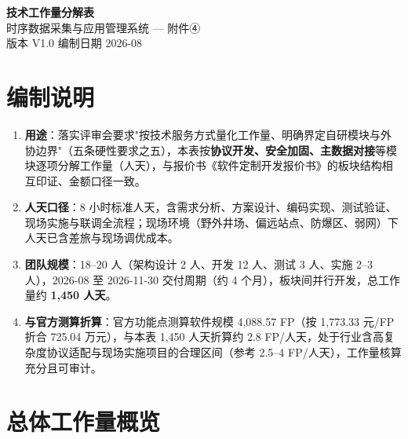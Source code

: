 \documentclass[11pt,a4paper]{ctexart}
\begin{document}
\begin{center}
{\Huge\bfseries 技术工作量分解表}\\[14pt]
{\large 时序数据采集与应用管理系统 — 附件④}\\[8pt]
{\large 版本 V1.0 \quad 编制日期 2026-08}
\end{center}

\vspace{1em}
\noindent\hrulefill
\vspace{1em}

\section{编制说明}

\begin{enumerate}[leftmargin=*]
  \item \textbf{用途}：落实评审会要求"按技术服务方式量化工作量、明确界定自研模块与外协边界"（五条硬性要求之五），本表按\textbf{协议开发、安全加固、主数据对接}等模块逐项分解工作量（人天），与报价书《软件定制开发报价书》的板块结构相互印证、金额口径一致。
  \item \textbf{人天口径}：8 小时标准人天，含需求分析、方案设计、编码实现、测试验证、现场实施与联调全流程；现场环境（野外井场、偏远站点、防爆区、弱网）下人天已含差旅与现场调优成本。
  \item \textbf{团队规模}：18--20 人（架构设计 2 人、开发 12 人、测试 3 人、实施 2--3 人），2026-08 至 2026-11-30 交付周期（约 4 个月），板块间并行开发，总工作量约 \textbf{1,450 人天}。
  \item \textbf{与官方测算折算}：官方功能点测算软件规模 4,088.57 FP（按 1,773.33 元/FP 折合 725.04 万元），与本表 1,450 人天折算约 2.8 FP/人天，处于行业含高复杂度协议适配与现场实施项目的合理区间（参考 2.5--4 FP/人天），工作量核算充分且可审计。
\end{enumerate}

\section{总体工作量概览}
\end{document}
